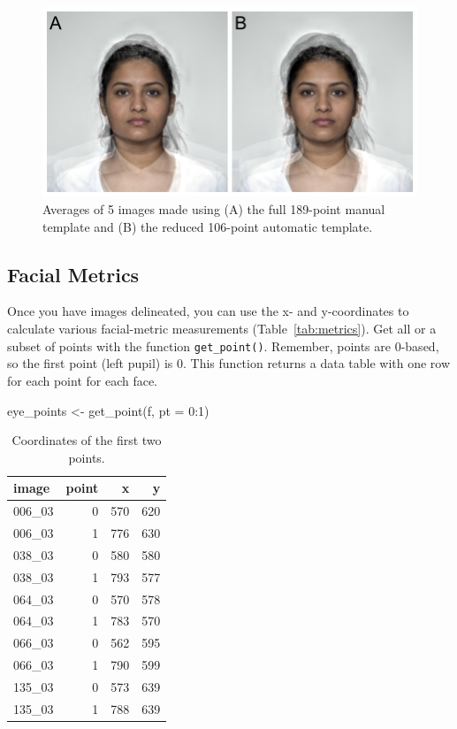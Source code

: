 \documentclass[
  man,floatsintext]{apa6}
\newenvironment{Shaded}{\begin{snugshade}}{\end{snugshade}}
\newcommand{\AttributeTok}[1]{\textcolor[rgb]{0.77,0.63,0.00}{#1}}
\newcommand{\DecValTok}[1]{\textcolor[rgb]{0.00,0.00,0.81}{#1}}
\newcommand{\FunctionTok}[1]{\textcolor[rgb]{0.00,0.00,0.00}{#1}}
\newcommand{\NormalTok}[1]{#1}
\newcommand{\OtherTok}[1]{\textcolor[rgb]{0.56,0.35,0.01}{#1}}
\newcommand{\SpecialCharTok}[1]{\textcolor[rgb]{0.00,0.00,0.00}{#1}}
\begin{document}
\begin{figure}
\includegraphics[width=1\linewidth]{index_files/figure-latex/avg-comp-1} \caption{Averages of 5 images made using (A) the full 189-point manual template and (B) the reduced 106-point automatic template.}\label{fig:avg-comp}
\end{figure}

\hypertarget{facial-metrics}{%
\subsection{Facial Metrics}\label{facial-metrics}}

Once you have images delineated, you can use the x- and y-coordinates to calculate various facial-metric measurements (Table~\ref{tab:metrics}). Get all or a subset of points with the function \texttt{get\_point()}. Remember, points are 0-based, so the first point (left pupil) is 0. This function returns a data table with one row for each point for each face.

\begin{Shaded}
\begin{Highlighting}[]
\NormalTok{eye\_points }\OtherTok{\textless{}{-}} \FunctionTok{get\_point}\NormalTok{(f, }\AttributeTok{pt =} \DecValTok{0}\SpecialCharTok{:}\DecValTok{1}\NormalTok{)}
\end{Highlighting}
\end{Shaded}

\begin{table}

\caption{\label{tab:unnamed-chunk-7}Coordinates of the first two points.}
\centering
\begin{tabular}[t]{l|r|r|r}
\hline
image & point & x & y\\
\hline
006\_03 & 0 & 570 & 620\\
\hline
006\_03 & 1 & 776 & 630\\
\hline
038\_03 & 0 & 580 & 580\\
\hline
038\_03 & 1 & 793 & 577\\
\hline
064\_03 & 0 & 570 & 578\\
\hline
064\_03 & 1 & 783 & 570\\
\hline
066\_03 & 0 & 562 & 595\\
\hline
066\_03 & 1 & 790 & 599\\
\hline
135\_03 & 0 & 573 & 639\\
\hline
135\_03 & 1 & 788 & 639\\
\hline
\end{tabular}
\end{table}
\end{document}
